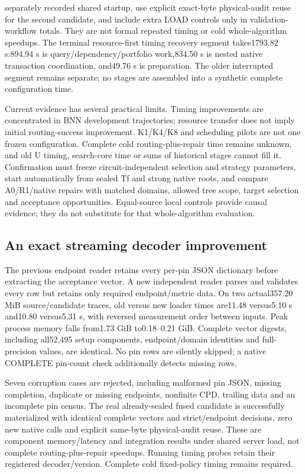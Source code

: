 \documentclass[conference,10pt]{IEEEtran}
\begin{document}
separately recorded shared startup, use explicit exact-byte physical-audit reuse for the second candidate, and include extra LOAD controls only in validation-workflow totals. They are not formal repeated timing or cold whole-algorithm speedups. The terminal resource-first timing recovery segment takes1793.82 s:894.94 s is query/dependency/portfolio work,834.50 s is nested native transaction coordination, and49.76 s is preparation. The older interrupted segment remains separate; no stages are assembled into a synthetic complete configuration time.

Current evidence has several practical limits. Timing improvements are concentrated in BNN development trajectories; resource transfer does not imply initial routing-success improvement. K1/K4/K8 and scheduling pilots are not one frozen configuration. Complete cold routing-plus-repair time remains unknown, and old U timing, search-core time or sums of historical stages cannot fill it. Confirmation must freeze circuit-independent selection and strategy parameters, start automatically from sealed Tf and strong native roots, and compare A0/R1/native repairs with matched domains, allowed tree scope, target selection and acceptance opportunities. Equal-source local controls provide causal evidence; they do not substitute for that whole-algorithm evaluation.

\subsection{An exact streaming decoder improvement}
The previous endpoint reader retains every per-pin JSON dictionary before extracting the acceptance vector. A new independent reader parses and validates every row but retains only required endpoint/metric data. On two actual357.20 MiB source/candidate traces, old versus new loader times are11.48 versus5.10 s and10.80 versus5.31 s, with reversed measurement order between inputs. Peak process memory falls from1.73 GiB to0.18--0.21 GiB. Complete vector digests, including all52,495 setup components, endpoint/domain identities and full-precision values, are identical. No pin rows are silently skipped; a native COMPLETE pin-count check additionally detects missing rows.

Seven corruption cases are rejected, including malformed pin JSON, missing completion, duplicate or missing endpoints, nonfinite CPD, trailing data and an incomplete pin census. The real already-sealed fused candidate is successfully materialized with identical complete vectors and strict/endpoint decisions, zero new native calls and explicit same-byte physical-audit reuse. These are component memory/latency and integration results under shared server load, not complete routing-plus-repair speedups. Running timing probes retain their registered decoder/version. Complete cold fixed-policy timing remains required.
\end{document}
